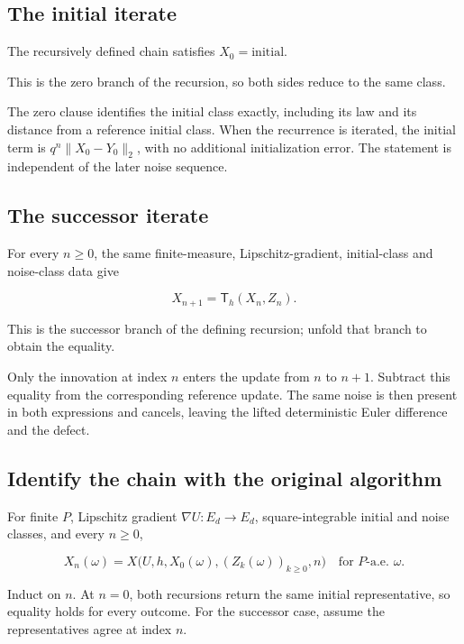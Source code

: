 \documentclass[11pt,a4paper]{article}
\begin{document}
\subsection{\texorpdfstring{The initial iterate}{The initial iterate}}


The recursively defined chain satisfies \(X_0=\mathrm{initial}\).



This is the zero branch of the recursion, so both sides reduce to the same class.



The zero clause identifies the initial class exactly, including its law and its distance from a reference initial class. When the recurrence is iterated, the initial term is \(q^n\|X_0-Y_0\|_2\), with no additional initialization error. The statement is independent of the later noise sequence.


\subsection{\texorpdfstring{The successor iterate}{The successor iterate}}


For every \(n\ge0\), the same finite-measure, Lipschitz-gradient, initial-class and noise-class data give

\[X_{n+1}=\mathsf T_h(X_n,Z_n).\]

This is the successor branch of the defining recursion; unfold that branch to obtain the equality.



Only the innovation at index \(n\) enters the update from \(n\) to \(n+1\). Subtract this equality from the corresponding reference update. The same noise is then present in both expressions and cancels, leaving the lifted deterministic Euler difference and the defect.


\subsection{\texorpdfstring{Identify the chain with the original algorithm}{Identify the chain with the original algorithm}}


For finite \(P\), Lipschitz gradient \(\nabla U:E_d\to E_d\), square-integrable initial and noise classes, and every \(n\ge0\),

\[X_n(\omega)=X\bigl(U,h,X_0(\omega),(Z_k(\omega))_{k\ge0},n\bigr)\quad\text{for }P\text{-a.e. }\omega.\]

Induct on \(n\). At \(n=0\), both recursions return the same initial representative, so equality holds for every outcome. For the successor case, assume the representatives agree at index \(n\).
\end{document}
